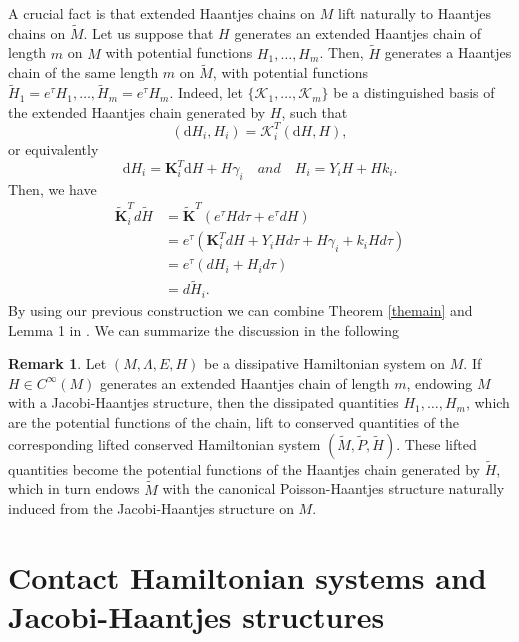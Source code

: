\documentclass[10pt]{amsart}
\numberwithin{equation}{section}
\newcommand{\rd}{\mathrm{d}}
\newcommand{\bs}{\boldsymbol}
\theoremstyle{definition}
\newtheorem{remark}{\textbf{Remark}}
\begin{document}
A crucial fact is that extended Haantjes chains on $M$ lift naturally to Haantjes chains on $\tilde{M}$. Let us suppose that $H$ generates an extended Haantjes chain of length $m$ on $M$ with potential functions $H_{1},\ldots,H_{m}$. Then, $\tilde{H}$ generates a Haantjes chain of the same length $m$ on $\tilde{M}$, with potential functions $\tilde{H}_{1}=e^{\tau}H_{1},\ldots ,\tilde{H}_{m}=e^{\tau}H_{m}$. Indeed, let $\{\bs{\mathcal{K}}_1,\ldots, \bs{\mathcal{K}}_m\}$ be a distinguished basis of the extended Haantjes chain generated by $H$, such that
\begin{equation}
 (\rd H_{i}, H_{i})= \bs{\mathcal{K}}_i^{T}(\rd H,H),
\end{equation}
or equivalently
\begin{equation}
\rd H_{i}=\bs{K}_{i}^{T}\rd H+H\gamma_{i}\quad\textit{and}\quad H_{i}=Y_{i}H+Hk_{i}.
\end{equation}
Then, we have 
\begin{equation}
\begin{split}
\tilde{\bs{K}}_{i}^{T}d\tilde{H}&= \tilde{\bs{K}}^{T}(e^{\tau}Hd\tau+e^{\tau}dH)\\
&=e^{\tau}(\bs{K}_{i}^{T}dH+Y_{i}Hd\tau+H\gamma_{i}+k_{i}Hd\tau)\\
&=e^{\tau}(dH_{i}+H_{i}d\tau)\\
&=d\tilde{H}_{i}.
\end{split}
\end{equation}
By using our previous construction we can combine Theorem \ref{themain} and Lemma 1 in \cite{T2018TMP}. We can summarize the discussion in the following
\begin{remark}
\label{remarkJHPH}
Let $(M,\Lambda,E,H)$ be a dissipative Hamiltonian system on $M$.
If $H\in C^{\infty}(M)$ generates an extended Haantjes chain of length $m$, endowing $M$ with a Jacobi-Haantjes structure, then the dissipated quantities $H_{1},\ldots,H_{m}$, which are the potential functions of the chain, lift to conserved quantities of the corresponding lifted conserved Hamiltonian system $(\tilde{M},\tilde{P},\tilde{H})$. These lifted quantities become the potential functions of the Haantjes chain generated by $\tilde{H}$, which in turn endows $\tilde{M}$ with the canonical Poisson-Haantjes structure naturally induced from the Jacobi-Haantjes structure on $M$.
\end{remark}





\section{Contact Hamiltonian systems and Jacobi-Haantjes structures}
\label{sec5}
\end{document}
